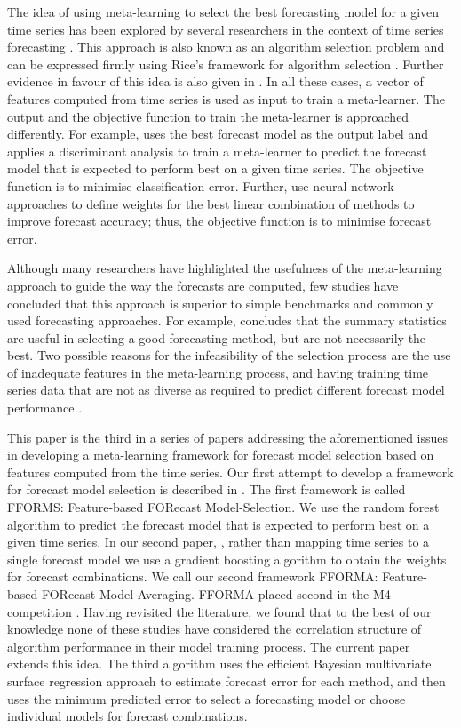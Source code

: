 \documentclass[11pt,a4paper,]{article}
\begin{document}
The idea of using meta-learning to select the best forecasting model for a given time series has been explored by several researchers in the context of time series forecasting \autocites{collopy1992rule}{shah1997model}{adya2001automatic}{wang2009rule}{Petropoulos2014}. This approach is also known as an algorithm selection problem and can be expressed firmly using Rice's framework for algorithm selection \autocite{rice1976}. Further evidence in favour of this idea is also given in \textcite{fforms}. In all these cases, a vector of features computed from time series is used as input to train a meta-learner. The output and the objective function to train the meta-learner is approached differently. For example, \textcite{shah1997model} uses the best forecast model as the output label and applies a discriminant analysis to train a meta-learner to predict the forecast model that is expected to perform best on a given time series. The objective function is to minimise classification error. Further, \textcite{prudencio2004using} use neural network approaches to define weights for the best linear combination of methods to improve forecast accuracy; thus, the objective function is to minimise forecast error.

Although many researchers have highlighted the usefulness of the meta-learning approach to guide the way the forecasts are computed, few studies have concluded that this approach is superior to simple benchmarks and commonly used forecasting approaches. For example, \textcite{meade2000evidence} concludes that the summary statistics are useful in selecting a good forecasting method, but are not necessarily the best. Two possible reasons for the infeasibility of the selection process are the use of inadequate features in the meta-learning process, and having training time series data that are not as diverse as required to predict different forecast model performance \autocite{kang2019gratis}.

This paper is the third in a series of papers addressing the aforementioned issues in developing a meta-learning framework for forecast model selection based on features computed from the time series. Our first attempt to develop a framework for forecast model selection is described in \textcite{fforms}. The first framework is called FFORMS: Feature-based FORecast Model-Selection. We use the random forest algorithm to predict the forecast model that is expected to perform best on a given time series. In our second paper, \textcite{fforma}, rather than mapping time series to a single forecast model we use a gradient boosting algorithm to obtain the weights for forecast combinations. We call our second framework FFORMA: Feature-based FORecast Model Averaging. FFORMA placed second in the M4 competition \autocite{makridakis2018m4}. Having revisited the literature, we found that to the best of our knowledge none of these studies have considered the correlation structure of algorithm performance in their model training process. The current paper extends this idea. The third algorithm uses the efficient Bayesian multivariate surface regression approach to estimate forecast error for each method, and then uses the minimum predicted error to select a forecasting model or choose individual models for forecast combinations.
\end{document}
